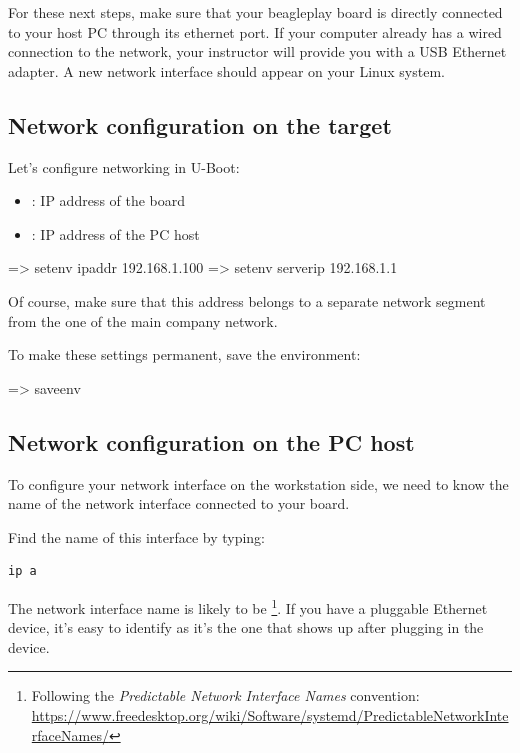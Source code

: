 For these next steps, make sure that your beagleplay board is directly connected
to your host PC through its ethernet port. If your computer already has a wired
connection to the network, your instructor will provide you with a USB Ethernet
adapter. A new network interface should appear on your Linux system.

\subsection{Network configuration on the target}

Let's configure networking in U-Boot:

\begin{itemize}
\item {}: IP address of the board
\item {}: IP address of the PC host
\end{itemize}

\begin{ubootinput}
=> setenv ipaddr 192.168.1.100
=> setenv serverip 192.168.1.1
\end{ubootinput}

Of course, make sure that this address belongs to a separate network
segment from the one of the main company network.

To make these settings permanent, save the environment:

\begin{ubootinput}
=> saveenv
\end{ubootinput}

\subsection{Network configuration on the PC host}

To configure your network interface on the workstation side, we need
to know the name of the network interface connected to your board.

Find the name of this interface by typing:

\begin{verbatim}
ip a
\end{verbatim}

The network interface name is likely to be
\footnote{Following the {\em Predictable Network Interface
Names} convention:
\url{https://www.freedesktop.org/wiki/Software/systemd/PredictableNetworkInterfaceNames/}}.
If you have a pluggable Ethernet device, it's easy to identify as it's
the one that shows up after plugging in the device.

